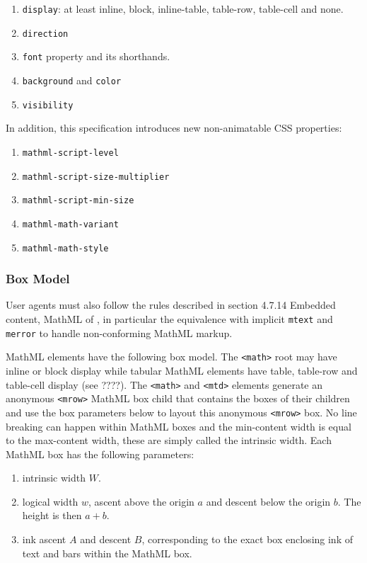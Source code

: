\begin{enumerate}
\item {\tt display}: at least inline, block, inline-table, table-row,
  table-cell and none.
\item {\tt direction}
\item {\tt font} property and its shorthands.
\item {\tt background} and {\tt color}
\item {\tt visibility}
\end{enumerate}

In addition, this specification introduces new non-animatable CSS properties:

\begin{enumerate}
\item {\tt mathml-script-level}
\item {\tt mathml-script-size-multiplier}
\item {\tt mathml-script-min-size}
\item {\tt mathml-math-variant}
\item {\tt mathml-math-style}
\end{enumerate}

\subsubsection{Box Model}

User agents must also follow the rules described in section 4.7.14
Embedded content, MathML of \cite{HTML5}, in particular the equivalence with
implicit {\tt mtext} and {\tt merror} to handle non-conforming MathML markup.

MathML elements have the following box model. The {\tt <math>} root may have
inline or block display while tabular MathML elements have table, table-row and
table-cell display (see ????). The {\tt <math>} and {\tt <mtd>} elements
generate an anonymous {\tt <mrow>} MathML box child that contains the boxes of
their children and use the box parameters below to layout this anonymous
{\tt <mrow>} box.
No line breaking can happen within MathML boxes and the min-content width is
equal to the max-content width, these are simply called the intrinsic width.
Each MathML box has the following parameters:

\begin{enumerate}
\item intrinsic width $W$.
\item logical width $w$, ascent above the origin $a$ and descent below the
  origin $b$. The height is then $a+b$.
\item ink ascent $A$ and descent $B$, corresponding to the exact box enclosing
  ink of text and bars within the MathML box.
\end{enumerate}


